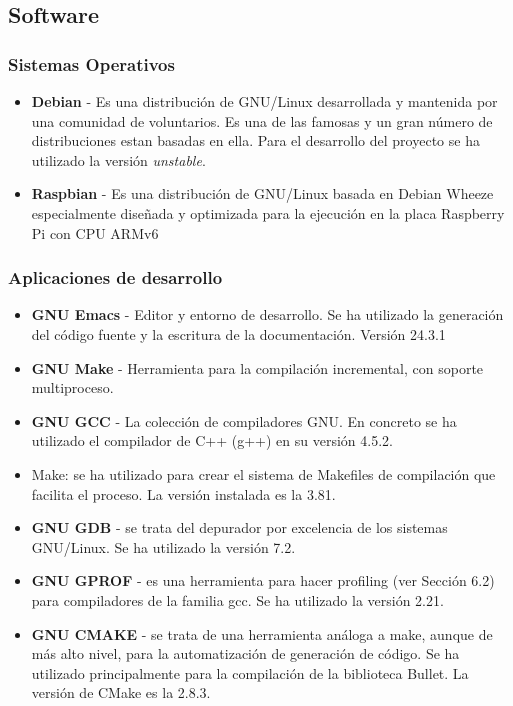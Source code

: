 \begin{description}
\begin{itemize}
\end{itemize}

\subsection{Software}
\subsubsection{Sistemas Operativos}

\begin{itemize}
\item \textbf{Debian} - Es una distribución de GNU/Linux desarrollada y mantenida por una comunidad de voluntarios. Es una de las famosas y un gran número de distribuciones estan basadas en ella. Para el desarrollo del proyecto se ha utilizado la versión \emph{unstable}. 

\item \textbf{Raspbian} - Es una distribución de GNU/Linux basada en Debian Wheeze especialmente diseñada y optimizada para la ejecución en la placa Raspberry Pi con  CPU ARMv6   
\end{itemize}

\subsubsection{Aplicaciones de desarrollo}
\begin{itemize}
\item \textbf{GNU Emacs} - Editor y entorno de desarrollo. Se ha utilizado la generación del código fuente y la escritura de la documentación. Versión 24.3.1
\item \textbf{GNU Make} - Herramienta para la compilación incremental, con soporte multiproceso.
\item \textbf{GNU GCC} - La colección de compiladores GNU. En concreto se ha utilizado el compilador de C++ (g++) en su versión 4.5.2.
\item Make: se ha utilizado para crear el sistema de Makefiles de compilación que facilita el proceso. La versión instalada es la 3.81.
\item \textbf{GNU GDB} - se trata del depurador por excelencia de los sistemas GNU/Linux. Se ha utilizado la versión 7.2.
\item \textbf{GNU GPROF} - es una herramienta para hacer profiling (ver Sección 6.2) para compiladores de la familia gcc. Se ha utilizado la versión 2.21.
\item \textbf{GNU CMAKE} - se trata de una herramienta análoga a make, aunque de más alto nivel, para la automatización de generación de código. Se ha utilizado principalmente para la compilación de la biblioteca Bullet. La versión de CMake es la 2.8.3. 
\end{itemize}


\end{description}
